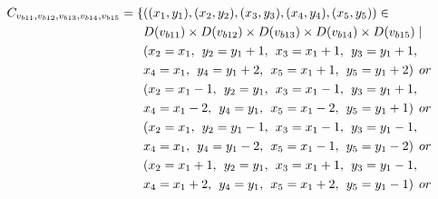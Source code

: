 \begin{align*}
\Cons{b11}{b12}{b13}{b14}{b15}=\{&((x_{1},y_{1}),(x_{2},y_{2}),(x_{3},y_{3}),(x_{4},y_{4}),(x_{5},y_{5}))\in \\
&\Domain {b11} \times \Domain{b12}\times \Domain{b13}\times \Domain{b14}\times \Domain{b15} \mid\\
&(x_{2} = x_{1},\hspace{1ex}y_{2} = y_{1}+1,\hspace{1ex}x_{3} = x_{1}+1,\hspace{1ex}y_{3} = y_{1}+1,
\\&x_{4} = x_{1},\hspace{1ex}y_{4} = y_{1}+2,\hspace{1ex}x_{5} = x_{1}+1,\hspace{1ex}y_{5} = y_{1}+2)\hspace{1ex} or \\
&(x_{2} = x_{1}-1 ,\hspace{1ex}y_{2} = y_{1},\hspace{1ex}x_{3} = x_{1}-1,\hspace{1ex}y_{3} = y_{1}+1,
\\&x_{4} = x_{1}-2,\hspace{1ex}y_{4} = y_{1},\hspace{1ex}x_{5} = x_{1}-2,\hspace{1ex}y_{5} = y_{1}+1)\hspace{1ex} or \\
&(x_{2} = x_{1} ,\hspace{1ex}y_{2} = y_{1}-1,\hspace{1ex}x_{3} = x_{1}-1,\hspace{1ex}y_{3} = y_{1}-1,
\\&x_{4} = x_{1},\hspace{1ex}y_{4} = y_{1}-2,\hspace{1ex}x_{5} = x_{1}-1,\hspace{1ex}y_{5} = y_{1}-2)\hspace{1ex} or \\
&(x_{2} = x_{1}+1 ,\hspace{1ex}y_{2} = y_{1},\hspace{1ex}x_{3} = x_{1}+1,\hspace{1ex}y_{3} = y_{1}-1,
\\&x_{4} = x_{1}+2,\hspace{1ex}y_{4} = y_{1},\hspace{1ex}x_{5} = x_{1}+2,\hspace{1ex}y_{5} = y_{1}-1)\hspace{1ex} or \\

\end{align*}
